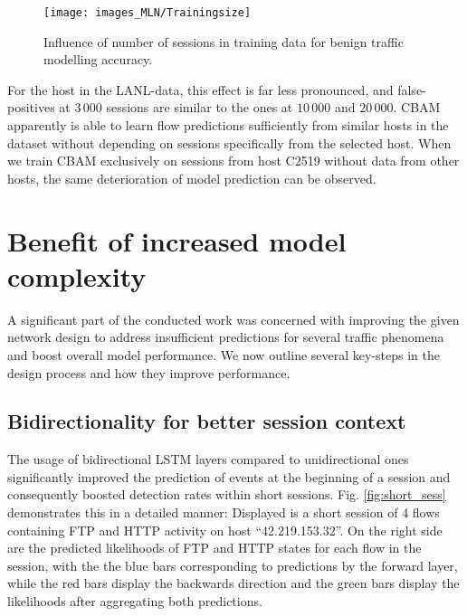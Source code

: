 \begin{figure}
\centering
\texttt{[image: images\_MLN/Trainingsize]} 
\caption{Influence of number of sessions in training data for benign traffic modelling accuracy.}\label{fig:Trainingsize}
\end{figure}
For the host in the LANL-data, this effect is far less pronounced, and false-positives at $3\,000$ sessions are similar to the ones at $10\,000$ and $20\,000$. CBAM apparently is able to learn flow predictions sufficiently from similar hosts in the dataset without depending on sessions specifically from the selected host. When we train CBAM exclusively on sessions from host C2519 without data from other hosts, the same deterioration of model prediction can be observed.

 






\section{Benefit of increased model complexity}\label{Sec:Modelcompl}

A significant part of the conducted work was concerned with improving the given network design to address insufficient predictions for several traffic phenomena and boost overall model performance. We now outline several key-steps in the design process and how they improve performance.

\subsection{Bidirectionality for better session context}\label{Sec:Bidir}

The usage of bidirectional LSTM layers compared to unidirectional ones significantly improved the prediction of events at the beginning of a session and consequently boosted detection rates within short sessions. Fig. \ref{fig:short_sess} demonstrates this in a detailed manner: Displayed is a short session of 4 flows containing FTP and HTTP activity on host ``42.219.153.32''. On the right side are the predicted likelihoods of FTP and HTTP states for each flow in the session, with the the blue bars corresponding to predictions by the forward layer, while the red bars display the backwards direction and the green bars display the likelihoods after aggregating both predictions. %

